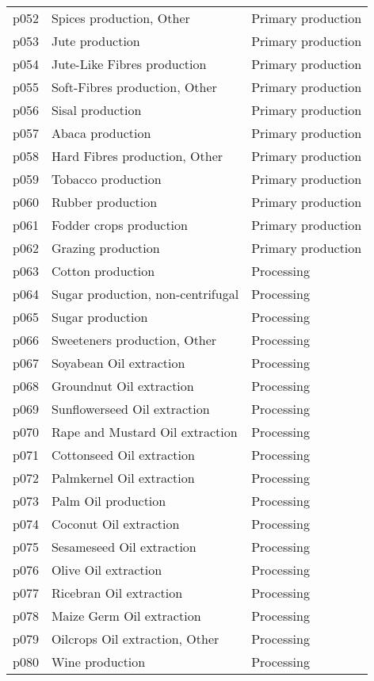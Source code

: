 \documentclass[]{article}
\begin{document}
\begin{longtable}[t]{lll}
p052 & Spices production, Other & Primary production\\
p053 & Jute production & Primary production\\
p054 & Jute-Like Fibres production & Primary production\\
p055 & Soft-Fibres production, Other & Primary production\\
\addlinespace
p056 & Sisal production & Primary production\\
p057 & Abaca production & Primary production\\
p058 & Hard Fibres production, Other & Primary production\\
p059 & Tobacco production & Primary production\\
p060 & Rubber production & Primary production\\
\addlinespace
p061 & Fodder crops production & Primary production\\
p062 & Grazing production & Primary production\\
p063 & Cotton production & Processing\\
p064 & Sugar production, non-centrifugal & Processing\\
p065 & Sugar production & Processing\\
\addlinespace
p066 & Sweeteners production, Other & Processing\\
p067 & Soyabean Oil extraction & Processing\\
p068 & Groundnut Oil extraction & Processing\\
p069 & Sunflowerseed Oil extraction & Processing\\
p070 & Rape and Mustard Oil extraction & Processing\\
\addlinespace
p071 & Cottonseed Oil extraction & Processing\\
p072 & Palmkernel Oil extraction & Processing\\
p073 & Palm Oil production & Processing\\
p074 & Coconut Oil extraction & Processing\\
p075 & Sesameseed Oil extraction & Processing\\
\addlinespace
p076 & Olive Oil extraction & Processing\\
p077 & Ricebran Oil extraction & Processing\\
p078 & Maize Germ Oil extraction & Processing\\
p079 & Oilcrops Oil extraction, Other & Processing\\
p080 & Wine production & Processing\\

\end{longtable}
\end{document}
